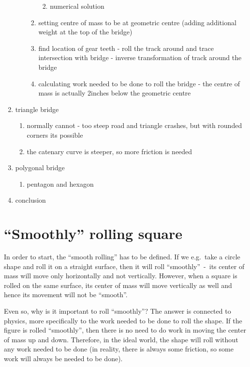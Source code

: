 \documentclass[12pt]{article}
\begin{document}
\begin{enumerate}
\begin{enumerate}
\begin{enumerate}
\begin{enumerate}
\begin{itemize}
                        \end{itemize}
                        \item numerical solution
                    \end{enumerate}
                    \item setting centre of mass to be at geometric centre (adding additional weight at the top of the bridge)
                    \item find location of gear teeth - roll the track around and trace intersection with bridge - inverse transformation of track around the bridge
                    \item calculating work needed to be done to roll the bridge - the centre of mass is actually 2inches below the geometric centre
                \end{enumerate}
            \end{enumerate}
            \item triangle bridge \begin{enumerate}
                \item normally cannot - too steep road and triangle crashes, but with rounded corners its possible
                \item the catenary curve is steeper, so more friction is needed
            \end{enumerate}
            \item polygonal bridge \begin{enumerate}
                \item pentagon and hexagon
            \end{enumerate}
            \item conclusion
        \end{enumerate}

    \section{``Smoothly'' rolling square}

        In order to start, the ``smooth rolling'' has to be defined. If we e.g.\ take a circle shape and roll it on a straight surface, then it will roll ``smoothly''~-~its center of mass will move only horizontally and not vertically. However, when a square is rolled on the same surface, its center of mass will move vertically as well and hence its movement will not be ``smooth''.

        Even so, why is it important to roll ``smoothly''? The answer is connected to physics, more specifically to the work needed to be done to roll the shape. If the figure is rolled ``smoothly'', then there is no need to do work in moving the center of mass up and down. Therefore, in the ideal world, the shape will roll without any work needed to be done (in reality, there is always some friction, so some work will always be needed to be done).
\end{document}
